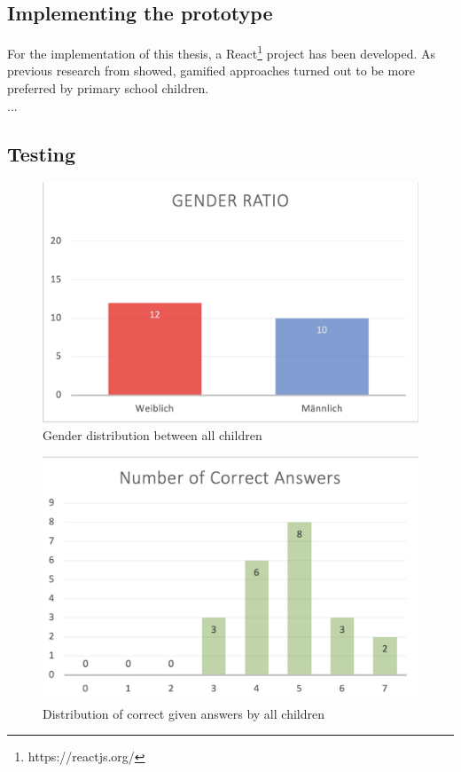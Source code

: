 \subsection{Implementing the prototype}
\label{subsection:ImplementingPrototype}
For the implementation of this thesis, a React\footnote{https://reactjs.org/} project has been developed. As previous research from \textcite{gossen2012search, lozano2016dedigitalizing} showed, gamified approaches turned out to be more preferred by primary school children.
\\...\\

\subsection{Testing}
\label{subsection:Testing}

\begin{figure}[!ht]
    \centering
    \includegraphics[width=1 \linewidth]{images/gender_ratio.png}
    \caption{
        Gender distribution between all children
    }
    \label{figure:GenderRatio}
\end{figure}

\begin{figure}[!ht]
    \centering
    \includegraphics[width=1 \linewidth]{images/num_corr_answers.png}
    \caption{
        Distribution of correct given answers by all children
    }
    \label{figure:NummCorrAnswers}
\end{figure}

